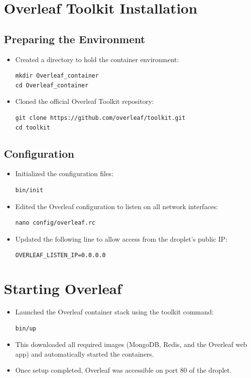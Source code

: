 \section{Overleaf Toolkit Installation}
\subsection{Preparing the Environment}
\begin{itemize}
    \item Created a directory to hold the container environment:
\begin{verbatim}
mkdir Overleaf_container
cd Overleaf_container
\end{verbatim}

    \item Cloned the official Overleaf Toolkit repository:
\begin{verbatim}
git clone https://github.com/overleaf/toolkit.git
cd toolkit
\end{verbatim}
\end{itemize}

\subsection{Configuration}
\begin{itemize}
    \item Initialized the configuration files:
\begin{verbatim}
bin/init
\end{verbatim}

    \item Edited the Overleaf configuration to listen on all network interfaces:
\begin{verbatim}
nano config/overleaf.rc
\end{verbatim}

    \item Updated the following line to allow access from the droplet’s public IP:
\begin{verbatim}
OVERLEAF_LISTEN_IP=0.0.0.0
\end{verbatim}
\end{itemize}

\section{Starting Overleaf}
\begin{itemize}
    \item Launched the Overleaf container stack using the toolkit command:
\begin{verbatim}
bin/up
\end{verbatim}

    \item This downloaded all required images (MongoDB, Redis, and the Overleaf web app) and automatically started the containers.
    \item Once setup completed, Overleaf was accessible on port 80 of the droplet.
\end{itemize}

